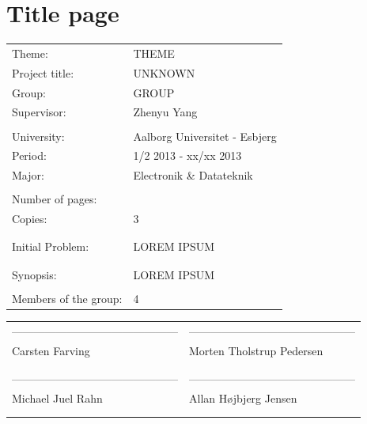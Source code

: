 \section*{Title page}
\setcounter{page}{1}
\begin{tabularx}{\hsize}{lX}
	Theme: & THEME \\
	Project title: & UNKNOWN \\
	Group: & GROUP \\
	Supervisor: & Zhenyu Yang \\\\
	University: & Aalborg Universitet - Esbjerg\\
	Period: & 1/2 2013 - xx/xx 2013 \\
	Major: & Electronik \& Datateknik \\\\
	Number of pages: & \pageref{LastPage} \\ 
	Copies: & 3\\\\\\
	Initial Problem: & LOREM IPSUM\\
	& \\\cline{2-2}\\
	Synopsis: & LOREM IPSUM  \\\\
	Members of the group: & 4 \\
\end{tabularx}


\vspace{1.5cm}
\noindent\begin{tabularx}{\hsize}{XX}
--------------------------------------------- & --------------------------------------------- \\
Carsten Farving & Morten Tholstrup Pedersen \\\\\\
--------------------------------------------- & --------------------------------------------- \\
Michael Juel Rahn & Allan H{\o}jbjerg Jensen \\\\\\
\end{tabularx}

\newpage